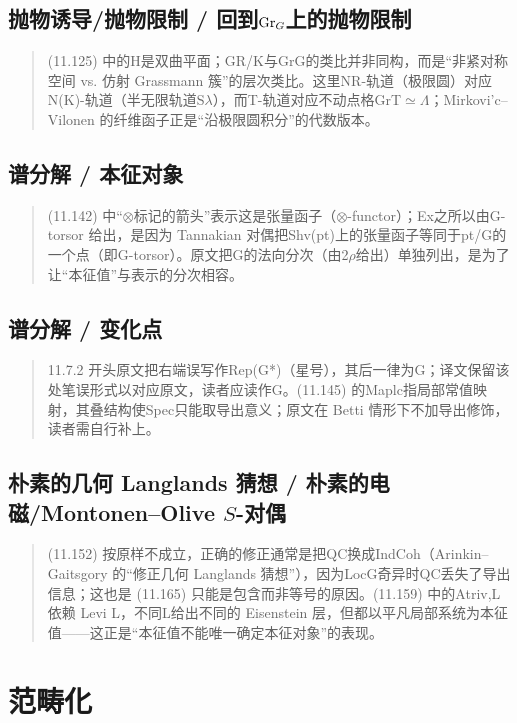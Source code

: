 \subsection*{抛物诱导/抛物限制 / 回到$\mathrm{Gr}_G$上的抛物限制}
\begin{quote}\small
(11.125) 中的H是双曲平面；GR/K与GrG的类比并非同构，而是“非紧对称空间 vs. 仿射 Grassmann 簇”的层次类比。这里NR-轨道（极限圆）对应N(K)-轨道（半无限轨道S$\lambda$），而T-轨道对应不动点格GrT$\simeq$$\Lambda$；Mirkovi'c–Vilonen 的纤维函子正是“沿极限圆积分”的代数版本。
\end{quote}

\subsection*{谱分解 / 本征对象}
\begin{quote}\small
(11.142) 中“$\otimes$标记的箭头”表示这是张量函子（$\otimes$-functor）；Ex之所以由G-torsor 给出，是因为 Tannakian 对偶把Shv(pt)上的张量函子等同于pt/G的一个点（即G-torsor）。原文把G的法向分次（由2$\rho$给出）单独列出，是为了让“本征值”与表示的分次相容。
\end{quote}

\subsection*{谱分解 / 变化点}
\begin{quote}\small
11.7.2 开头原文把右端误写作Rep(G*)（星号），其后一律为G；译文保留该处笔误形式以对应原文，读者应读作G。(11.145) 的Maplc指局部常值映射，其叠结构使Spec只能取导出意义；原文在 Betti 情形下不加导出修饰，读者需自行补上。
\end{quote}

\subsection*{朴素的几何 Langlands 猜想 / 朴素的电磁/Montonen–Olive $S$-对偶}
\begin{quote}\small
(11.152) 按原样不成立，正确的修正通常是把QC换成IndCoh（Arinkin–Gaitsgory 的“修正几何 Langlands 猜想”），因为LocG奇异时QC丢失了导出信息；这也是 (11.165) 只能是包含而非等号的原因。(11.159) 中的Atriv,L依赖 Levi L，不同L给出不同的 Eisenstein 层，但都以平凡局部系统为本征值——这正是“本征值不能唯一确定本征对象”的表现。
\end{quote}

\section{范畴化}

